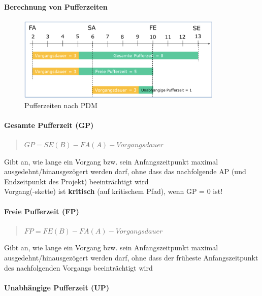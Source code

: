 \documentclass[a4paper]{article}
\begin{document}
			\paragraph{Berechnung von Pufferzeiten}
			
			\begin{figure}[!htb]
				\centering
				\includegraphics[height=4cm]{img/pm/pdm_pufferzeiten.png}
				\caption{Pufferzeiten nach PDM}
				\label{fig:pm_pdm_pufferzeiten}
			\end{figure}
			
			\paragraph{Gesamte Pufferzeit (GP)}
			
			\begin{quote}
				$GP = SE(B) - FA(A) - Vorgangsdauer$
			\end{quote}
			\noindent
			Gibt an, wie lange ein Vorgang bzw. sein Anfangszeitpunkt maximal ausgedehnt/hinausgezögert werden darf, ohne dass das nachfolgende AP (und Endzeitpunkt des Projekt) beeinträchtigt wird\\
			Vorgang(-skette) ist \textbf{kritisch} (auf kritischem Pfad), wenn GP = 0 ist!
			
			\paragraph{Freie Pufferzeit (FP)}
			
			\begin{quote}
				$FP = FE(B) - FA(A) - Vorgangsdauer$
			\end{quote}
			\noindent
			Gibt an, wie lange ein Vorgang bzw. sein Anfangszeitpunkt maximal ausgedehnt/hinausgezögert werden darf, ohne dass der früheste Anfangszeitpunkt des nachfolgenden Vorgangs beeinträchtigt wird
			
			\paragraph{Unabhängige Pufferzeit (UP)}
			
\end{document}
